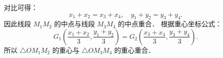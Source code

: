 \begin{answer}
对比可得：
\nopagebreak[4]
\[
x_1 + x_2 = x_3 + x_4, \quad y_1 + y_2 = y_3 + y_4.
\]
因此线段 $M_1 M_2$ 的中点与线段 $M_3 M_4$ 的中点重合．
根据重心坐标公式：
\nopagebreak[4]
\[
G_1\left(\frac{x_1 + x_2}{3}, \frac{y_1 + y_2}{3}\right) = G_2\left(\frac{x_3 + x_4}{3}, \frac{y_3 + y_4}{3}\right).
\]
所以 $\triangle OM_1 M_2$ 的重心与 $\triangle OM_3 M_4$ 的重心重合．




\end{answer}